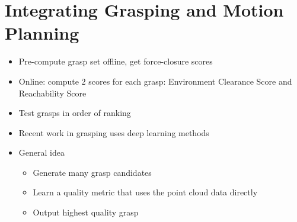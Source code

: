 \documentclass[../main.tex]{subfiles}
\begin{document}
    \section{Integrating Grasping and Motion Planning}
    \begin{itemize}
        \item Pre-compute grasp set offline, get force-closure scores
        \item Online: compute 2 scores for each grasp: Environment Clearance Score and Reachability Score
        \item Test grasps in order of ranking
        \item Recent work in grasping uses deep learning methods
        \item General idea
        \begin{itemize}
            \item Generate many grasp candidates
            \item Learn a quality metric that uses the point cloud data directly
            \item Output highest quality grasp
        \end{itemize}
    \end{itemize}
\end{document}
